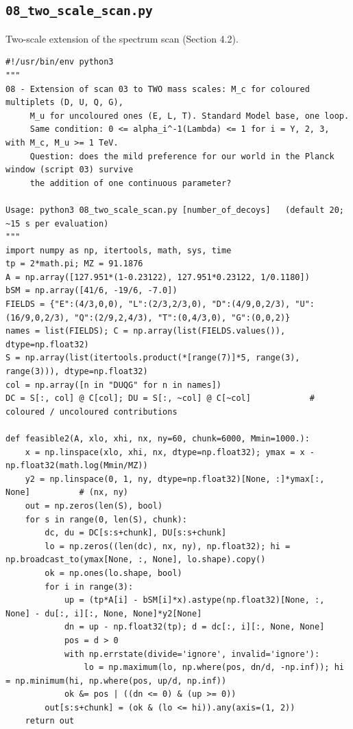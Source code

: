 \documentclass[11pt,a4paper]{article}
\begin{document}
\subsection{\texttt{08\_two\_scale\_scan.py}}
Two-scale extension of the spectrum scan (Section 4.2).
\begin{lstlisting}
#!/usr/bin/env python3
"""
08 - Extension of scan 03 to TWO mass scales: M_c for coloured multiplets (D, U, Q, G),
     M_u for uncoloured ones (E, L, T). Standard Model base, one loop.
     Same condition: 0 <= alpha_i^-1(Lambda) <= 1 for i = Y, 2, 3, with M_c, M_u >= 1 TeV.
     Question: does the mild preference for our world in the Planck window (script 03) survive
     the addition of one continuous parameter?

Usage: python3 08_two_scale_scan.py [number_of_decoys]   (default 20; ~15 s per evaluation)
"""
import numpy as np, itertools, math, sys, time
tp = 2*math.pi; MZ = 91.1876
A = np.array([127.951*(1-0.23122), 127.951*0.23122, 1/0.1180])
bSM = np.array([41/6, -19/6, -7.0])
FIELDS = {"E":(4/3,0,0), "L":(2/3,2/3,0), "D":(4/9,0,2/3), "U":(16/9,0,2/3), "Q":(2/9,2,4/3), "T":(0,4/3,0), "G":(0,0,2)}
names = list(FIELDS); C = np.array(list(FIELDS.values()), dtype=np.float32)
S = np.array(list(itertools.product(*[range(7)]*5, range(3), range(3))), dtype=np.float32)
col = np.array([n in "DUQG" for n in names])
DC = S[:, col] @ C[col]; DU = S[:, ~col] @ C[~col]            # coloured / uncoloured contributions

def feasible2(A, xlo, xhi, nx, ny=60, chunk=6000, Mmin=1000.):
    x = np.linspace(xlo, xhi, nx, dtype=np.float32); ymax = x - np.float32(math.log(Mmin/MZ))
    y2 = np.linspace(0, 1, ny, dtype=np.float32)[None, :]*ymax[:, None]          # (nx, ny)
    out = np.zeros(len(S), bool)
    for s in range(0, len(S), chunk):
        dc, du = DC[s:s+chunk], DU[s:s+chunk]
        lo = np.zeros((len(dc), nx, ny), np.float32); hi = np.broadcast_to(ymax[None, :, None], lo.shape).copy()
        ok = np.ones(lo.shape, bool)
        for i in range(3):
            up = (tp*A[i] - bSM[i]*x).astype(np.float32)[None, :, None] - du[:, i][:, None, None]*y2[None]
            dn = up - np.float32(tp); d = dc[:, i][:, None, None]
            pos = d > 0
            with np.errstate(divide='ignore', invalid='ignore'):
                lo = np.maximum(lo, np.where(pos, dn/d, -np.inf)); hi = np.minimum(hi, np.where(pos, up/d, np.inf))
            ok &= pos | ((dn <= 0) & (up >= 0))
        out[s:s+chunk] = (ok & (lo <= hi)).any(axis=(1, 2))
    return out


\end{lstlisting}
\end{document}
